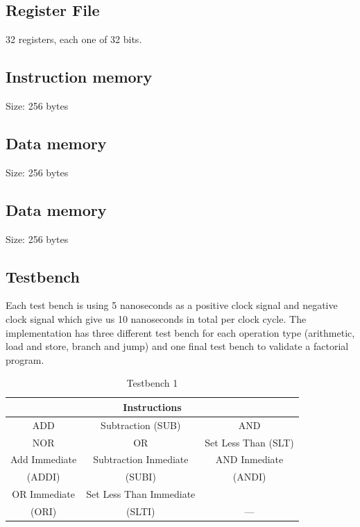 \documentclass[conference]{IEEEtran}
\begin{document}
\subsection{Register File}
32 registers, each one of 32 bits.
\subsection{Instruction memory}
Size: 256 bytes
\subsection{Data memory}
Size: 256 bytes\\
\subsection{Data memory}
Size: 256 bytes\\
\subsection{Testbench}
Each test bench is using 5 nanoseconds as a positive clock signal and negative clock signal which give us 10 nanoseconds in total per clock cycle. The implementation has three different test bench for each operation type (arithmetic, load and store, branch and jump) and one final test bench to validate a factorial program.

\FloatBarrier
\begin{table}[htbp]
	\caption{Testbench 1} %
	\begin{tabular}{|c|c|c|}
		\hline
		\multicolumn{3}{|c|}{\textbf{Instructions}} \\
		\hline
		ADD&Subtraction (SUB)&AND  \\
		\hline
		NOR&OR&Set Less Than (SLT) \\
		\hline
		Add Immediate&Subtraction Inmediate & AND Inmediate \\
		(ADDI) &(SUBI) & (ANDI) \\
		\hline
		OR Immediate&Set Less Than Immediate&  \\
		(ORI)&(SLTI)& --- \\
		\hline
	\end{tabular}
	\label{tab_test1}
\end{table}
\FloatBarrier
\end{document}
